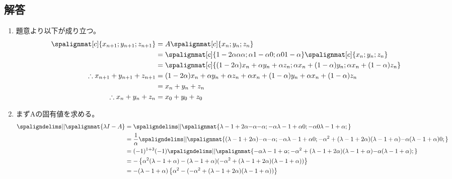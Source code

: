 \documentclass[dvipdfmx,titlepage, 11pt, a4paper]{jsarticle}%
\begin{document}
\subsection{解答}
\begin{enumerate}[(1)]
	\item 題意より以下が成り立つ。
		\begin{align*}
			\spalignmat[c]{
				{x_{n + 1}};
				{y_{n + 1}};
				{z_{n + 1}}
			} 
			& = A
			\spalignmat[c]{
				{x_n};
				{y_n};
				{z_n}
			}\\
			& = \spalignmat[c]{
				{1 - 2\alpha} {\alpha} {\alpha};
				{\alpha} {1 - \alpha} {0};
				{\alpha} {0} {1 - \alpha}
			}
			\spalignmat[c]{
				{x_n};
				{y_n};
				{z_n}
			}\\
			& = \spalignmat[c]{
				{(1 - 2\alpha)x_n + \alpha y_n + \alpha z_n};
				{\alpha x_n + (1 - \alpha)y_n};
				{\alpha x_n + (1 - \alpha)z_n}
			}\\
			\therefore
			x_{n + 1} + y_{n + 1} + z_{n + 1} 
			&=  (1 - 2\alpha)x_n + \alpha y_n + \alpha z_n + \alpha x_n + (1 - \alpha)y_n + \alpha x_n + (1 - \alpha)z_n\\
			&=  x_n + y_n + z_n\\
			\therefore
			x_n + y_n + z_n &= x_0 + y_0 + z_0
		\end{align*}
	\item まずAの固有値を求める。
		\begin{align*}
			\spaligndelims\vert\vert \spalignmat{{\lambda I - A}}
			& = \spaligndelims\vert\vert \spalignmat{
			{\lambda - 1 + 2\alpha} {-\alpha} {-\alpha};
			{-\alpha} {\lambda - 1 + \alpha} {0};
			{-\alpha} {0} {\lambda - 1 + \alpha};
			}\\
			& = \frac{1}{\alpha}\spaligndelims\vert\vert \spalignmat{
			{(\lambda - 1 + 2\alpha)} {-\alpha} {-\alpha};
			{-\alpha} {\lambda - 1 + \alpha} {0};
			{-\alpha^{2} + (\lambda - 1 + 2\alpha)(\lambda - 1 + \alpha)} {-\alpha(\lambda - 1 + \alpha)} {0};
			}\\
			& = (-1)^{1 + 3}(-1)\spaligndelims\vert\vert \spalignmat{
			{-\alpha} {\lambda - 1 + \alpha};
			{-\alpha^{2} + (\lambda - 1 + 2\alpha)(\lambda - 1 + \alpha)} {-\alpha(\lambda - 1 + \alpha)};
			}\\
			& = -\left\{\alpha^{2}(\lambda - 1 + \alpha) - (\lambda - 1 + \alpha)(-\alpha^{2} + (\lambda - 1 + 2\alpha)(\lambda - 1 + \alpha))\right\} \\
			& = -(\lambda - 1 + \alpha)\left\{\alpha^{2} - (-\alpha^{2} + (\lambda - 1 + 2\alpha)(\lambda - 1 + \alpha))\right\}                       \\

\end{align*}
\end{enumerate}
\end{document}
